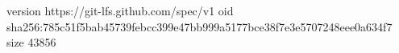 version https://git-lfs.github.com/spec/v1
oid sha256:785c51f5bab45739febcc399e47bb999a5177bce38f7e3e5707248eee0a634f7
size 43856
